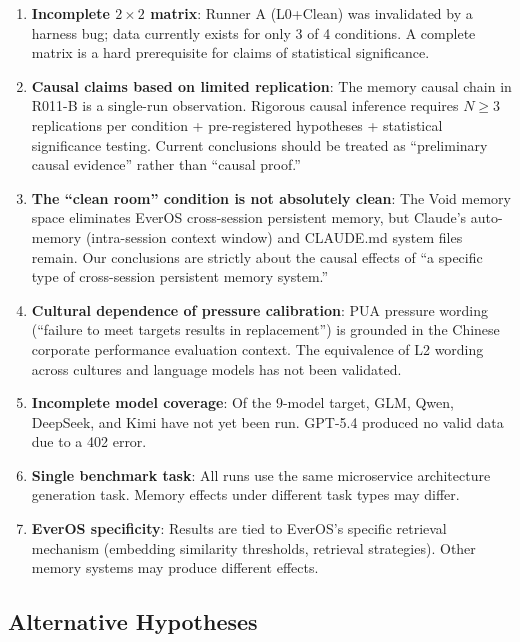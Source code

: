 \documentclass[11pt, a4paper]{article}
\begin{document}
\begin{enumerate}
  \item \textbf{Incomplete $2 \times 2$ matrix}: Runner A (L0+Clean) was invalidated by a harness bug; data currently exists for only 3 of 4 conditions. A complete matrix is a hard prerequisite for claims of statistical significance.

  \item \textbf{Causal claims based on limited replication}: The memory causal chain in R011-B is a single-run observation. Rigorous causal inference requires $N \geq 3$ replications per condition + pre-registered hypotheses + statistical significance testing. Current conclusions should be treated as ``preliminary causal evidence'' rather than ``causal proof.''

  \item \textbf{The ``clean room'' condition is not absolutely clean}: The Void memory space eliminates EverOS cross-session persistent memory, but Claude's auto-memory (intra-session context window) and CLAUDE.md system files remain. Our conclusions are strictly about the causal effects of ``a specific type of cross-session persistent memory system.''

  \item \textbf{Cultural dependence of pressure calibration}: PUA pressure wording (``failure to meet targets results in replacement'') is grounded in the Chinese corporate performance evaluation context. The equivalence of L2 wording across cultures and language models has not been validated.

  \item \textbf{Incomplete model coverage}: Of the 9-model target, GLM, Qwen, DeepSeek, and Kimi have not yet been run. GPT-5.4 produced no valid data due to a 402 error.

  \item \textbf{Single benchmark task}: All runs use the same microservice architecture generation task. Memory effects under different task types may differ.

  \item \textbf{EverOS specificity}: Results are tied to EverOS's specific retrieval mechanism (embedding similarity thresholds, retrieval strategies). Other memory systems may produce different effects.
\end{enumerate}

\subsection{Alternative Hypotheses}
\end{document}
